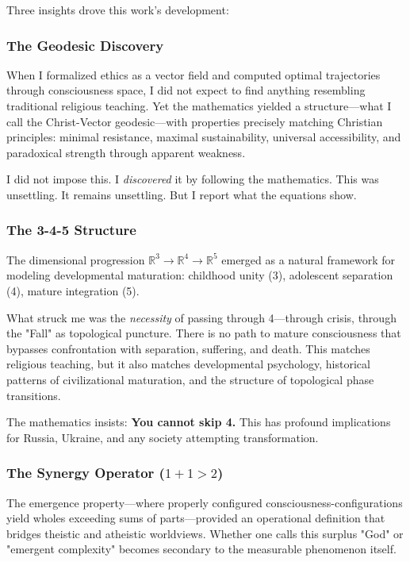 \documentclass[11pt,a4paper]{article}
\theoremstyle{definition}
\theoremstyle{remark}
\begin{document}
Three insights drove this work's development:

\subsubsection{The Geodesic Discovery}

When I formalized ethics as a vector field and computed optimal trajectories through consciousness space, I did not expect to find anything resembling traditional religious teaching. Yet the mathematics yielded a structure—what I call the Christ-Vector geodesic—with properties precisely matching Christian principles: minimal resistance, maximal sustainability, universal accessibility, and paradoxical strength through apparent weakness.

I did not impose this. I \textit{discovered} it by following the mathematics. This was unsettling. It remains unsettling. But I report what the equations show.

\subsubsection{The 3-4-5 Structure}

The dimensional progression \(\mathbb{R}^3 \to \mathbb{R}^4 \to \mathbb{R}^5\) emerged as a natural framework for modeling developmental maturation: childhood unity (3), adolescent separation (4), mature integration (5). 

What struck me was the \textit{necessity} of passing through 4—through crisis, through the "Fall" as topological puncture. There is no path to mature consciousness that bypasses confrontation with separation, suffering, and death. This matches religious teaching, but it also matches developmental psychology, historical patterns of civilizational maturation, and the structure of topological phase transitions.

The mathematics insists: \textbf{You cannot skip 4.} This has profound implications for Russia, Ukraine, and any society attempting transformation.

\subsubsection{The Synergy Operator (\(1+1>2\))}

The emergence property—where properly configured consciousness-configurations yield wholes exceeding sums of parts—provided an operational definition that bridges theistic and atheistic worldviews. Whether one calls this surplus "God" or "emergent complexity" becomes secondary to the measurable phenomenon itself.
\end{document}
